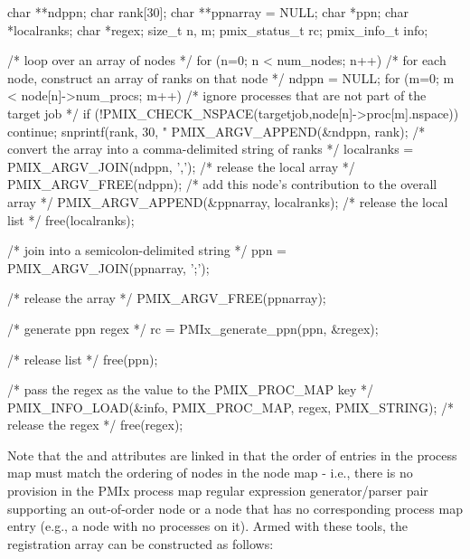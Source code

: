 \cspecificstart
\begin{codepar}
char **ndppn;
char rank[30];
char **ppnarray = NULL;
char *ppn;
char *localranks;
char *regex;
size_t n, m;
pmix_status_t rc;
pmix_info_t info;

/* loop over an array of nodes */
for (n=0; n < num_nodes; n++) {
    /* for each node, construct an array of ranks on that node */
    ndppn = NULL;
    for (m=0; m < node[n]->num_procs; m++) {
        /* ignore processes that are not part of the target job */
        if (!PMIX_CHECK_NSPACE(targetjob,node[n]->proc[m].nspace)) {
            continue;
        }
        snprintf(rank, 30, "%
        PMIX_ARGV_APPEND(&ndppn, rank);
    }
    /* convert the array into a comma-delimited string of ranks */
    localranks = PMIX_ARGV_JOIN(ndppn, ',');
    /* release the local array */
    PMIX_ARGV_FREE(ndppn);
    /* add this node's contribution to the overall array */
    PMIX_ARGV_APPEND(&ppnarray, localranks);
    /* release the local list */
    free(localranks);
}

/* join into a semicolon-delimited string */
ppn = PMIX_ARGV_JOIN(ppnarray, ';');

/* release the array */
PMIX_ARGV_FREE(ppnarray);

/* generate ppn regex */
rc = PMIx_generate_ppn(ppn, &regex);

/* release list */
free(ppn);

/* pass the regex as the value to the PMIX_PROC_MAP key */
PMIX_INFO_LOAD(&info, PMIX_PROC_MAP, regex, PMIX_STRING);
/* release the regex */
free(regex);

\end{codepar}
\cspecificend

Note that the  and  attributes are linked in that the order of entries in the process map must match the ordering of nodes in the node map - i.e., there is no provision in the \ac{PMIx} process map regular expression generator/parser pair supporting an out-of-order node or a node that has no corresponding process map entry (e.g., a node with no processes on it). Armed with these tools, the registration  array can be constructed as follows:

